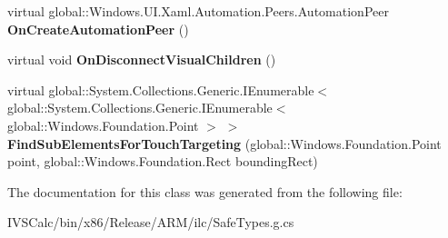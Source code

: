 \begin{DoxyCompactItemize}
virtual global\+::\+Windows.\+U\+I.\+Xaml.\+Automation.\+Peers.\+Automation\+Peer {\bfseries On\+Create\+Automation\+Peer} ()
\item 
\mbox{\label{class_windows_1_1_u_i_1_1_xaml_1_1_u_i_element_a044b9e7fd69b9591b9342e63f4414a7f}} 
virtual void {\bfseries On\+Disconnect\+Visual\+Children} ()
\item 
\mbox{\label{class_windows_1_1_u_i_1_1_xaml_1_1_u_i_element_a706c639a70707ea7a264a54ff755ff5c}} 
virtual global\+::\+System.\+Collections.\+Generic.\+I\+Enumerable$<$ global\+::\+System.\+Collections.\+Generic.\+I\+Enumerable$<$ global\+::\+Windows.\+Foundation.\+Point $>$ $>$ {\bfseries Find\+Sub\+Elements\+For\+Touch\+Targeting} (global\+::\+Windows.\+Foundation.\+Point point, global\+::\+Windows.\+Foundation.\+Rect bounding\+Rect)
\end{DoxyCompactItemize}


The documentation for this class was generated from the following file\+:\begin{DoxyCompactItemize}
\item 
I\+V\+S\+Calc/bin/x86/\+Release/\+A\+R\+M/ilc/Safe\+Types.\+g.\+cs\end{DoxyCompactItemize}
